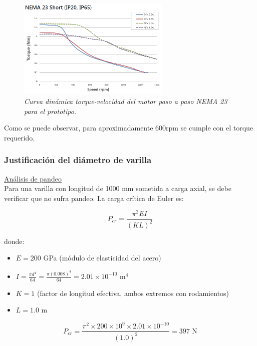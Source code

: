 \begin{figure}[H]
    \centering
    \includegraphics[width=0.65\textwidth]{img/nema23_proto.png}
    \caption{\textit{Curva dinámica torque-velocidad del motor paso a paso NEMA 23 para el prototipo.}}
    \label{fig:Curva_din_nema17medium}
\end{figure}

Como se puede observar, para aproximadamente 600rpm se cumple con el torque requerido.\\

\subsubsection{Justificación del diámetro de varilla}

\underline{Análisis de pandeo}\\
Para una varilla con longitud de 1000 mm sometida a carga axial, se debe verificar que no sufra pandeo. La carga crítica de Euler es:

\begin{equation}
P_{cr} = \frac{\pi^2 E I}{(K L)^2}
\end{equation}

donde:
\begin{itemize}[label=$\bullet$]
    \item $E = 200$ GPa (módulo de elasticidad del acero)
    \item $I = \frac{\pi d^4}{64} = \frac{\pi (0.008)^4}{64} = 2.01 \times 10^{-10}$ m$^4$
    \item $K = 1$ (factor de longitud efectiva, ambos extremos con rodamientos)
    \item $L = 1.0$ m
\end{itemize}

\begin{equation}
P_{cr} = \frac{\pi^2 \times 200 \times 10^9 \times 2.01 \times 10^{-10}}{(1.0)^2} = 397 \text{ N}
\end{equation}

